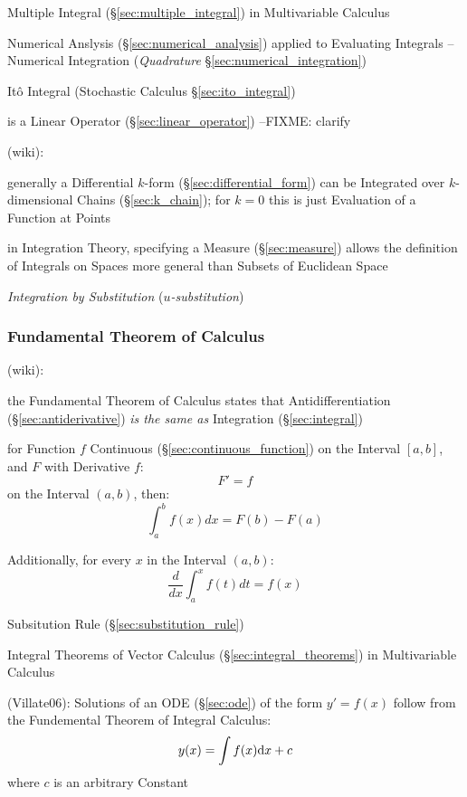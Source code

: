 \fist Multiple Integral (\S\ref{sec:multiple_integral}) in Multivariable
Calculus

\fist Numerical Anslysis (\S\ref{sec:numerical_analysis}) applied to Evaluating
Integrals -- Numerical Integration (\emph{Quadrature}
\S\ref{sec:numerical_integration})

\fist It\^o Integral (Stochastic Calculus \S\ref{sec:ito_integral})

is a Linear Operator (\S\ref{sec:linear_operator}) --FIXME: clarify

(wiki):

generally a Differential $k$-form (\S\ref{sec:differential_form}) can be
Integrated over $k$-dimensional Chains (\S\ref{sec:k_chain}); for $k=0$ this is
just Evaluation of a Function at Points

in Integration Theory, specifying a Measure (\S\ref{sec:measure}) allows the
definition of Integrals on Spaces more general than Subsets of Euclidean Space

\asterism

\emph{Integration by Substitution} (\emph{$u$-substitution})



\subsubsection{Fundamental Theorem of Calculus}
\label{sec:fundamental_calculus_theorem}

(wiki):

the Fundamental Theorem of Calculus states that Antidifferentiation
(\S\ref{sec:antiderivative}) \emph{is the
  same as} Integration (\S\ref{sec:integral})

for Function $f$ Continuous (\S\ref{sec:continuous_function}) on the Interval
$[a,b]$, and $F$ with Derivative $f$:
\[
  F' = f
\]
on the Interval $(a,b)$, then:
\[
  \int_a^b f(x) dx = F(b) - F(a)
\]

Additionally, for every $x$ in the Interval $(a,b)$:
\[
  \frac{d}{dx}\int^x_a f(t) dt = f(x)
\]

\fist Subsitution Rule (\S\ref{sec:substitution_rule})

\fist Integral Theorems of Vector Calculus
(\S\ref{sec:integral_theorems}) in Multivariable Calculus

(Villate06): Solutions of an ODE (\S\ref{sec:ode}) of the form $y' = f(x)$
follow from the Fundemental Theorem of Integral Calculus:
\[
  y(x) = \int f(x) \mathrm{d}x + c
\]
where $c$ is an arbitrary Constant



